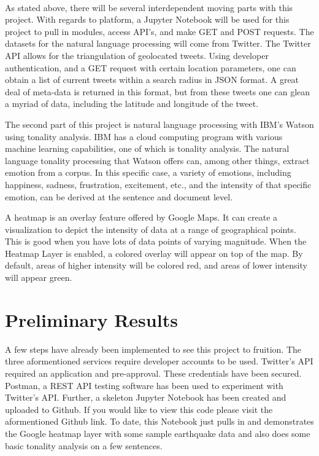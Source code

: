 \documentclass[12pt, oneside]{article}
\begin{document}
\paragraph{}
As stated above, there will be several interdependent moving parts with this
project. With regards to platform, a Jupyter Notebook will be used for this
project to pull in modules, access API's, and make GET and POST requests.
The datasets for the natural language processing will come from Twitter. The
Twitter API allows for the triangulation of geolocated tweets\cite{TwitterGeo}.
Using developer authentication, and a GET request with certain location
parameters, one can obtain a list of current tweets within a search radius in
JSON format. A great deal of meta-data is returned in this format, but from
these tweets one can glean a myriad of data, including the latitude and
longitude of the tweet.

The second part of this project is natural language processing with IBM's
Watson using tonality analysis.
IBM has a cloud computing program with various machine learning
capabilities\cite{IBM}, one of which is tonality analysis. The natural language
tonality processing that Watson offers can, among other things, extract emotion
from a corpus. In this specific case, a variety of emotions, including happiness, sadness, frustration, excitement, etc., and the intensity of that specific emotion, can be
derived at the sentence and document level.

A heatmap is an overlay feature offered by Google Maps. It can create a
visualization to depict the intensity of data at a range of geographical points.
This is good when you have lots of data points of varying magnitude. When the
Heatmap Layer is enabled, a colored overlay will appear on top of the map. By
default, areas of higher intensity will be colored red, and areas of lower
intensity will appear green\cite{Google}.

\section{Preliminary Results}
A few steps have already been implemented to see this project to fruition. The
three aformentioned services require developer accounts to be used.
Twitter's API required an application and pre-approval. These credentials have
been secured. Postman, a REST API testing software has been used to experiment
with Twitter's API\cite{Postman}. Further, a skeleton Jupyter Notebook has
been created and uploaded to Github\cite{Git}. If you would like to view this code please visit the aformentioned Github link. To date, this Notebook just
pulls in and demonstrates the Google heatmap layer with some sample earthquake
data and also does some basic tonality analysis on a few sentences.
\end{document}

